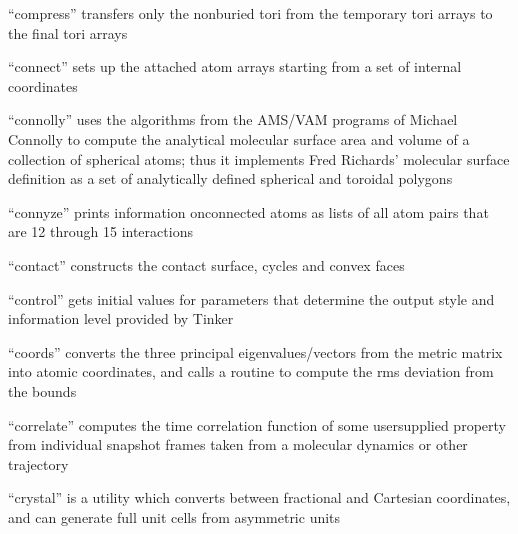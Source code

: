 \documentclass[letterpaper,11pt,english]{sphinxmanual}
\begin{document}

“compress” transfers only the non\sphinxhyphen{}buried tori from
the temporary tori arrays to the final tori arrays


“connect” sets up the attached atom arrays
starting from a set of internal coordinates


“connolly” uses the algorithms from the AMS/VAM programs of
Michael Connolly to compute the analytical molecular surface
area and volume of a collection of spherical atoms; thus
it implements Fred Richards’ molecular surface definition as
a set of analytically defined spherical and toroidal polygons


“connyze” prints information onconnected atoms as lists
of all atom pairs that are 1\sphinxhyphen{}2 through 1\sphinxhyphen{}5 interactions


“contact” constructs the contact surface, cycles and convex faces


“control” gets initial values for parameters that determine
the output style and information level provided by Tinker


“coords” converts the three principal eigenvalues/vectors from
the metric matrix into atomic coordinates, and calls a routine
to compute the rms deviation from the bounds


“correlate” computes the time correlation function of some
user\sphinxhyphen{}supplied property from individual snapshot frames taken
from a molecular dynamics or other trajectory






“crystal” is a utility which converts between fractional and
Cartesian coordinates, and can generate full unit cells from
asymmetric units
\end{document}
